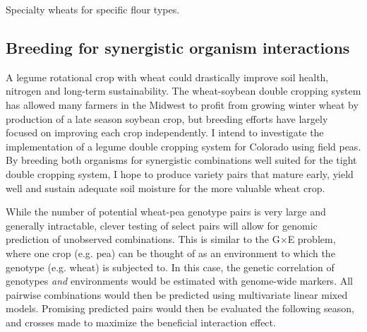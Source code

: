 \documentclass[11pt]{article}
\begin{document}
Specialty wheats for specific flour types.  


\subsection*{Breeding for synergistic organism interactions}

A legume rotational crop with wheat could drastically improve soil health, nitrogen and long-term sustainability. The wheat-soybean double cropping system has allowed many farmers in the Midwest to profit from growing winter wheat by production of a late season soybean crop, but breeding efforts have largely focused on improving each crop independently. I intend to investigate the implementation of a legume double cropping system for Colorado using field peas. By breeding both organisms for synergistic combinations well suited for the tight double cropping system, I hope to produce variety pairs that mature early, yield well and sustain adequate soil moisture for the more valuable wheat crop. 


While the number of potential wheat-pea genotype pairs is very large and generally intractable, clever testing of select pairs will allow for genomic prediction of unobserved combinations. This is similar to the G$\times$E problem, where one crop (e.g. pea) can be thought of as an environment to which the genotype (e.g. wheat) is subjected to. In this case, the genetic correlation of genotypes \emph{and} environments would be estimated with genome-wide markers. All pairwise combinations would then be predicted using multivariate linear mixed models. Promising predicted pairs would then be evaluated the following season, and crosses made to maximize the beneficial interaction effect. %

\end{document}
